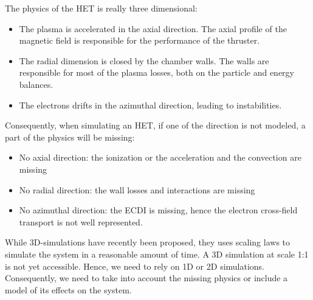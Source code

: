   The physics of the \ac{HET} is really three dimensional\string:

  \begin{itemize}
    \item The plasma is accelerated in the axial direction. The axial profile of the magnetic field is responsible for the performance of the thruster.
    \item The radial dimension is closed by the chamber walls. The walls are responsible for most of the plasma losses, both on the particle and energy balances.
    \item The electrons drifts in the azimuthal direction, leading to instabilities.
  \end{itemize}

  Consequently, when simulating an \ac{HET}, if one of the direction is not modeled, a part of the physics will be missing\string:
  \begin{itemize}
    \item No axial direction\string: the ionization or the acceleration and the convection are missing
    \item No radial direction\string: the wall losses and interactions are missing
    \item No azimuthal direction\string: the \ac{ECDI} is missing, hence the electron cross-field transport is not well represented.
  \end{itemize}

  While \ac{3D}-simulations have recently been proposed, they uses scaling laws to simulate the system in a reasonable amount of time.
  A \ac{3D} simulation at scale {1\string:1} is not yet accessible.
  Hence, we need to rely on \ac{1D} or \ac{2D} simulations.
  Consequently, we need to take into account the missing physics or include a model of its effects on the system.
